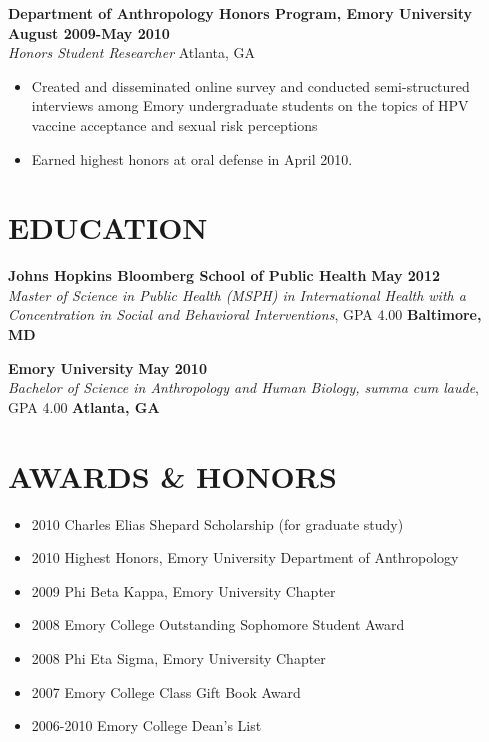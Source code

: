 \documentclass{res}
\begin{document}
\begin{resume}
\textbf{Department of Anthropology Honors Program, Emory University} \hfill \textbf{August 2009-May 2010} \\
\emph{Honors Student Researcher} \hfill Atlanta, GA
 \begin{itemize} \itemsep -2pt
  \item Created and disseminated online survey and conducted semi-structured interviews among Emory undergraduate students on the topics of HPV vaccine acceptance and sexual risk perceptions
  \item Earned highest honors at oral defense in April 2010.  
\end{itemize} \vspace{-6pt}

\section{EDUCATION} 
\vspace{8pt} 
\textbf{Johns Hopkins Bloomberg School of Public Health}  \hfill \textbf{May 2012} \\
\emph{Master of Science in Public Health (MSPH) in International Health with a Concentration in Social and Behavioral Interventions}, GPA 4.00 \hfill \textbf{Baltimore, MD}

\vspace{8pt} 
\textbf{Emory University}  \hfill \textbf{May 2010}\\
\emph{Bachelor of Science in Anthropology and Human Biology, summa cum laude}, GPA 4.00 \hfill \textbf{Atlanta, GA}

\section{AWARDS \& HONORS}
\begin{itemize} \itemsep -2pt
	\item 2010 Charles Elias Shepard Scholarship (for graduate study)
	\item 2010 Highest Honors, Emory University Department of Anthropology
    \item 2009 Phi Beta Kappa, Emory University Chapter
	\item 2008 Emory College Outstanding Sophomore Student Award
	\item 2008 Phi Eta Sigma, Emory University Chapter
	\item 2007 Emory College Class Gift Book Award
	\item 2006-2010 Emory College Dean’s List
\end{itemize}


\end{resume}
\end{document}
